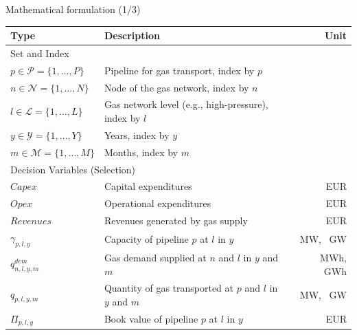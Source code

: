 \documentclass[aspectratio=169]{beamer}
\begin{document}
\begin{frame}{Mathematical formulation (1/3)}
	\begin{center}
		\vspace{-0.75cm}
		\renewcommand{\arraystretch}{1.}
		\centering
		\small
		\begin{tabular}{lm{7.75cm}r}
			Type & Description & Unit\\
			\hline
			Set and Index & & \\
			\hline
			{$p \in \mathcal{P}=\{1,\ldots,P\}$} & Pipeline for gas transport, index by $p$\\
			{$n \in \mathcal{N}=\{1,\ldots,N\}$} & Node of the gas network, index by $n$\\
			{$l \in \mathcal{L}=\{1,\ldots,L\}$} & Gas network level (e.g., high-pressure), index by $l$\\
			{$y \in \mathcal{Y}=\{1,\ldots,Y\}$} & Years, index by $y$\\
			{$m \in \mathcal{M}=\{1,\ldots,M\}$} & Months, index by $m$\\
			\hline
			\multicolumn{2}{l}{Decision Variables (Selection)}\\
			\hline
			{$Capex$} & Capital expenditures & \SI{}{EUR}\\
			{$Opex$} & Operational expenditures & \SI{}{EUR}\\
			{$Revenues$} & Revenues generated by gas supply & \SI{}{EUR}\\
			{$\gamma_{p,l,y}$} & Capacity of pipeline $p$ at $l$ in $y$& \SI{}{MW}, \SI{}{GW}\\
			{$q^{dem}_{n,l,y,m}$} & Gas demand supplied at $n$ and $l$ in $y$ and $m$ & \SI{}{MWh}, \SI{}{GWh}\\
			{$q_{p,l,y,m}$} & Quantity of gas transported at $p$ and $l$ in $y$ and $m$& \SI{}{MW}, \SI{}{GW}\\
			{$\Pi_{p,l,y}$} & Book value of pipeline $p$ at $l$ in $y$ & \SI{}{EUR}\\
			\hline
		\end{tabular}
	\end{center}
\end{frame}
\end{document}
